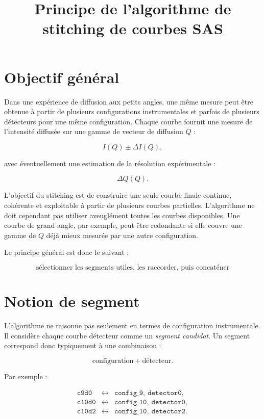 \documentclass[11pt,a4paper]{article}
\title{Principe de l'algorithme de stitching de courbes SAS}
\author{}
\date{}
\begin{document}
\maketitle

\section{Objectif général}

Dans une expérience de diffusion aux petits angles, une même mesure peut être
obtenue à partir de plusieurs configurations instrumentales et parfois de
plusieurs détecteurs pour une même configuration. Chaque courbe fournit une
mesure de l'intensité diffusée sur une gamme de vecteur de diffusion $Q$ :

\[
    I(Q) \pm \Delta I(Q),
\]

avec éventuellement une estimation de la résolution expérimentale :

\[
    \Delta Q(Q).
\]

L'objectif du stitching est de construire une seule courbe finale continue,
cohérente et exploitable à partir de plusieurs courbes partielles. L'algorithme
ne doit cependant pas utiliser aveuglément toutes les courbes disponibles. Une
courbe de grand angle, par exemple, peut être redondante si elle couvre une
gamme de $Q$ déjà mieux mesurée par une autre configuration.

Le principe général est donc le suivant :

\[
\boxed{
    \text{sélectionner les segments utiles, les raccorder, puis concaténer}
}
\]

\section{Notion de segment}

L'algorithme ne raisonne pas seulement en termes de configuration instrumentale.
Il considère chaque courbe détecteur comme un \emph{segment candidat}. Un
segment correspond donc typiquement à une combinaison :

\[
    \text{configuration} + \text{détecteur}.
\]

Par exemple :

\[
\begin{array}{lll}
    \texttt{c9d0}   & \leftrightarrow & \texttt{config\_9},\ \texttt{detector0}, \\
    \texttt{c10d0}  & \leftrightarrow & \texttt{config\_10},\ \texttt{detector0}, \\
    \texttt{c10d2}  & \leftrightarrow & \texttt{config\_10},\ \texttt{detector2}.
\end{array}
\]
\end{document}
